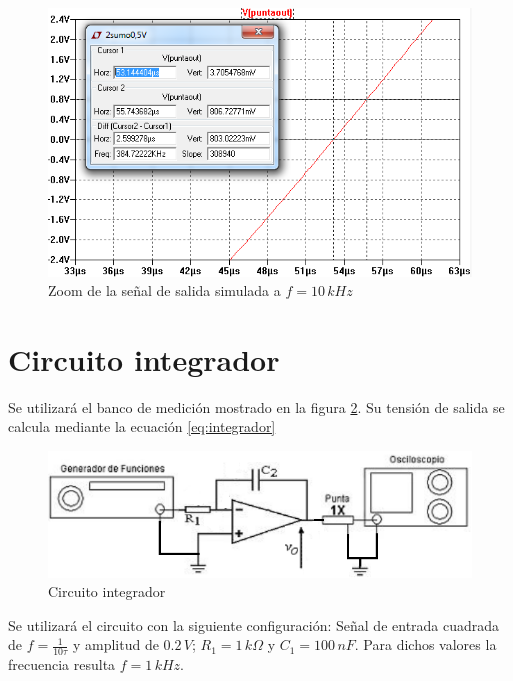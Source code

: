 \documentclass[10pt,spanish,a4paper,openany,notitlepage]{article}
\begin{document}
\begin{figure}[H]
\centering
\includegraphics[scale=0.8]{simulaciones/A2sumo0,5V10KHzZOOM.png}
\caption{Zoom de la señal de salida simulada a $f = 10\,\unit{kHz}$}
\label{fig:A2sumo0,5V10KHzZOOM}
\end{figure}




\section{Circuito integrador}

Se utilizará el banco de medición mostrado en la figura \ref{fig:integrador}.
Su tensión de salida se calcula mediante la ecuación \ref{eq:integrador}

\begin{figure}[H]
\centering
\includegraphics[scale=0.8]{circuitos/BsinR2.png}
\caption{Circuito integrador}
\label{fig:integrador}
\end{figure}



Se utilizará el circuito con la siguiente configuración: Señal de entrada cuadrada de 
$f= \frac{1}{10 \tau}$ y amplitud de $0.2\,\unit{V}$;  $R_1 = 1\,\unit{k\Omega}$ y 
$C_1 = 100\,\unit{nF}$. Para dichos valores la frecuencia resulta $f = 1\,\unit{kHz}$.
\end{document}

